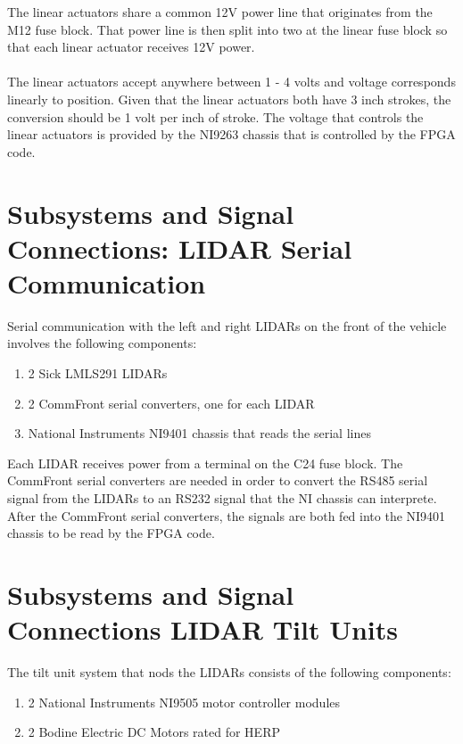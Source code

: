 The linear actuators share a common 12V power line that originates from the M12 fuse block. That power line is then split into two at the linear fuse block so that each linear actuator receives 12V power. \\ \\
%
\noindent The linear actuators accept anywhere between 1 - 4 volts and voltage corresponds linearly to position. Given that the linear actuators both have 3 inch strokes, the conversion should be 1 volt per inch of stroke. The voltage that controls the linear actuators is provided by the NI9263 chassis that is controlled by the FPGA code. 

\section{Subsystems and Signal Connections: LIDAR Serial Communication}

Serial communication with the left and right LIDARs on the front of the vehicle involves the following components:

\begin{enumerate}
\item 2 Sick LMLS291 LIDARs
\item 2 CommFront serial converters, one for each LIDAR
\item National Instruments NI9401 chassis that reads the serial lines
\end{enumerate}

Each LIDAR receives power from a terminal on the C24 fuse block. The CommFront serial converters are needed in order to convert the RS485 serial signal from the LIDARs to an RS232 signal that the NI chassis can interprete. After the CommFront serial converters, the signals are both fed into the NI9401 chassis to be read by the FPGA code.

\section {Subsystems and Signal Connections LIDAR Tilt Units}

The tilt unit system that nods the LIDARs consists of the following components:

\begin{enumerate}
\item 2 National Instruments NI9505 motor controller modules
\item 2 Bodine Electric DC Motors rated for HERP
\end{enumerate}


